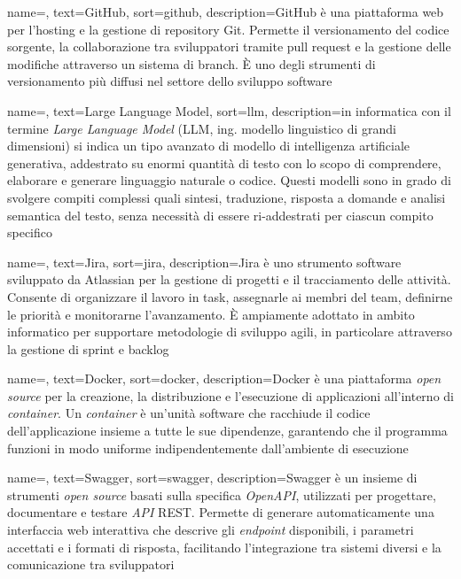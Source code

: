  {
    name=,
    text=GitHub,
    sort=github,
    description={GitHub è una piattaforma web per l'hosting e la gestione di repository Git. Permette il versionamento del codice sorgente, la collaborazione tra sviluppatori tramite pull request e la gestione delle modifiche attraverso un sistema di branch. È uno degli strumenti di versionamento più diffusi nel settore dello sviluppo software}
}

 {
    name=,
    text=Large Language Model,
    sort=llm,
    description={in informatica con il termine \emph{Large Language Model} (LLM, ing. modello linguistico di grandi dimensioni) si indica un tipo avanzato di modello di intelligenza artificiale generativa, addestrato su enormi quantità di testo con lo scopo di comprendere, elaborare e generare linguaggio naturale o codice. Questi modelli sono in grado di svolgere compiti complessi quali sintesi, traduzione, risposta a domande e analisi semantica del testo, senza necessità di essere ri-addestrati per ciascun compito specifico}
}

 {
    name=,
    text=Jira,
    sort=jira,
    description={Jira è uno strumento software sviluppato da Atlassian per la gestione di progetti e il tracciamento delle attività. Consente di organizzare il lavoro in task, assegnarle ai membri del team, definirne le priorità e monitorarne l'avanzamento. È ampiamente adottato in ambito informatico per supportare metodologie di sviluppo agili, in particolare attraverso la gestione di sprint e backlog}
}

 {
    name=,
    text=Docker,
    sort=docker,
    description={Docker è una piattaforma \emph{open source} per la creazione, la distribuzione e l'esecuzione di applicazioni all'interno di \emph{container}.
    Un \emph{container} è un'unità software che racchiude il codice dell'applicazione
    insieme a tutte le sue dipendenze, garantendo che il programma funzioni in modo uniforme indipendentemente dall'ambiente di esecuzione}
}

 {
    name=,
    text=Swagger,
    sort=swagger,
    description={Swagger è un insieme di strumenti \emph{open source} basati sulla specifica \emph{OpenAPI}, utilizzati per progettare, documentare e testare \emph{API} REST. Permette di generare automaticamente una interfaccia web interattiva che descrive gli \emph{endpoint} disponibili, i parametri accettati e i formati di risposta, facilitando l'integrazione tra sistemi diversi e la comunicazione tra sviluppatori}
}

